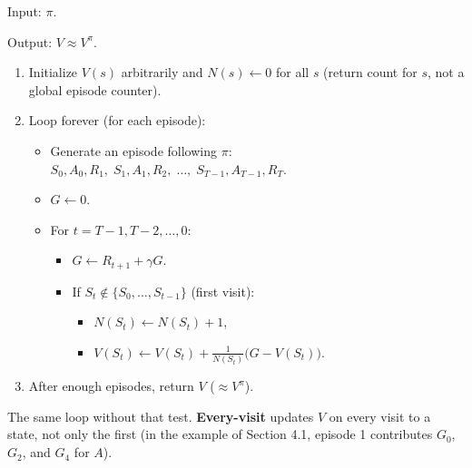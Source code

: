 \begin{implnote}
Input: $\pi$.

Output: $V\approx V^\pi$.

\begin{enumerate}
\item Initialize $V(s)$ arbitrarily and $N(s)\leftarrow 0$ for all $s$ (return count for $s$, not a global episode counter).
\item Loop forever (for each episode):
\begin{itemize}
\item Generate an episode following $\pi$:   $S_0,A_0,R_1,\;S_1,A_1,R_2,\;\ldots,\;S_{T-1},A_{T-1},R_T$.
\item $G\leftarrow 0$.
\item For $t=T{-}1,T{-}2,\ldots,0$:
\begin{itemize}
\item $G\leftarrow R_{t+1}+\gamma G$.
\item If $S_t\notin\{S_0,\ldots,S_{t-1}\}$ (first visit):
\begin{itemize}
\item $N(S_t)\leftarrow N(S_t)+1$,
\item $V(S_t)\leftarrow V(S_t)+\frac{1}{N(S_t)}\bigl(G-V(S_t)\bigr)$.
\end{itemize}
\end{itemize}
\end{itemize}
\item After enough episodes, return $V$ ($\approx V^\pi$).
\end{enumerate}

\end{implnote}

The same loop without that test. \textbf{Every-visit} updates $V$ on every visit to a state, not only the first (in the example of Section 4.1, episode 1 contributes $G_0$, $G_2$, and $G_4$ for $A$).


